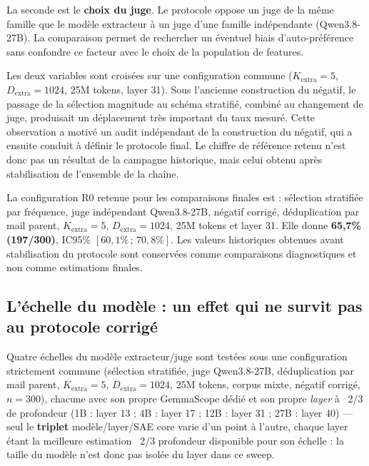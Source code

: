 \documentclass[11pt]{article}
\begin{document}
La seconde est le \textbf{choix du juge}. Le protocole oppose un juge de la même
famille que le modèle extracteur à un juge d'une famille indépendante (Qwen3.8-27B).
La comparaison permet de rechercher un éventuel biais d'auto-préférence sans confondre
ce facteur avec le choix de la population de features.

Les deux variables sont croisées sur une configuration commune
($K_\text{extra}=5$, $D_\text{extra}=1024$, 25M tokens, layer 31). Sous l'ancienne
construction du négatif, le passage de la sélection magnitude au schéma stratifié,
combiné au changement de juge, produisait un déplacement très important du taux
mesuré. Cette observation a motivé un audit indépendant de la construction du négatif,
qui a ensuite conduit à définir le protocole final. Le chiffre de référence retenu
n'est donc pas un résultat de la campagne historique, mais celui obtenu après
stabilisation de l'ensemble de la chaîne.

\begin{resultbox}
La configuration R0 retenue pour les comparaisons finales est : sélection stratifiée
par fréquence, juge indépendant Qwen3.8-27B, négatif corrigé, déduplication par mail
parent, $K_\text{extra}=5$, $D_\text{extra}=1024$, 25M tokens et layer 31. Elle donne
\textbf{65,7\% (197/300)}, IC95\% $[60{,}1\%\,;\,70{,}8\%]$.
Les valeurs historiques obtenues avant stabilisation du protocole sont conservées
comme comparaisons diagnostiques et non comme estimations finales.
\end{resultbox}

\subsection{L'échelle du modèle : un effet qui ne survit pas au protocole corrigé}
\label{subsec:model-scale}

Quatre échelles du modèle extracteur/juge sont testées sous une configuration
strictement commune (sélection stratifiée, juge Qwen3.8-27B, déduplication
par mail parent, $K_\text{extra}=5$, $D_\text{extra}=1024$, 25M tokens,
corpus mixte, négatif corrigé, $n=300$), chacune avec son propre GemmaScope
dédié et son propre \emph{layer} à \og{}~2/3 de profondeur\fg{}
\cite{formal2026splare} (1B : layer 13 ; 4B : layer 17 ; 12B : layer 31 ;
27B : layer 40) --- seul le \textbf{triplet} modèle/layer/SAE core varie
d'un point à l'autre, chaque layer étant la meilleure estimation
\og{}~2/3 profondeur\fg{} disponible pour son échelle : la taille du modèle
n'est donc pas isolée du layer dans ce sweep.
\end{document}
